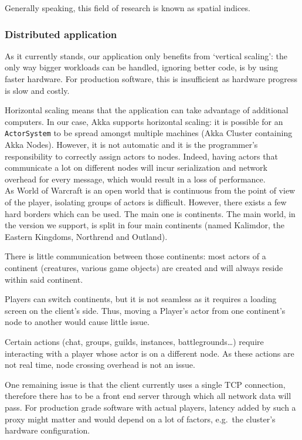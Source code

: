 \documentclass[paper=a4, fontsize=11pt]{scrartcl}
\begin{document}
Generally speaking, this field of research is known as spatial indices.

\subsubsection{Distributed application}\label{distr}

As it currently stands, our application only benefits from `vertical scaling':
the only way bigger workloads can be handled, ignoring better code, is by using
faster hardware.
For production software, this is insufficient as hardware progress is slow
and costly.

Horizontal scaling means that the application can take advantage of additional
computers.
In our case, Akka supports horizontal scaling: it is possible for an
\texttt{ActorSystem} to be spread amongst multiple machines (Akka Cluster
containing Akka Nodes).
However, it is not automatic and it is the programmer's responsibility to
correctly assign actors to nodes.
Indeed, having actors that communicate a lot on different nodes will incur
serialization and network overhead for every message, which would result in a
loss of performance.\\

As World of Warcraft is an open world that is continuous from the point of view
of the player, isolating groups of actors is difficult.
However, there exists a few hard borders which can be used.
The main one is continents. The main world, in the version we support, is split
in four main continents (named Kalimdor, the Eastern Kingdoms, Northrend and
Outland).

There is little communication between those continents: most actors of a
continent (creatures, various game objects) are created and will always reside
within said continent.

Players can switch continents, but it is not seamless as it requires a loading
screen on the client's side.
Thus, moving a Player's actor from one continent's node to another would
cause little issue.

Certain actions (chat, groups, guilds, instances, battlegrounds\ldots) 
require interacting with a player whose actor is on a different node.
As these actions are not real time, node crossing overhead is not an issue.

One remaining issue is that the client currently uses a single TCP connection,
therefore there has to be a front end server through which all network data
will pass.
For production grade software with actual players, latency added by such a proxy
might matter and would depend on a lot of factors, e.g.\ the cluster's hardware
configuration.
\end{document}
